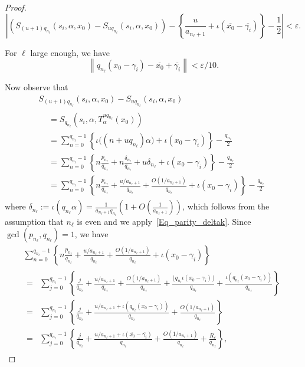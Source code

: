\documentclass[AHL,Unicode,longabstracts,published]{cedram}
\newcommand{\kj}{n_{\ell}}
\begin{document}
\begin{proof}
\begin{equation}\label{partial_sum_sawtooth}
\left|\left(S_{(u+1)q_{\kj}}(s_i,\alpha,x_0) - S_{uq_{\kj}}(s_i,\alpha,x_0)\right)
- \left \{ \frac{u}{a_{\kj +1}} + \iota(\overline{x_0} - \overline{\gamma_i}) \right \} - \frac{1}{2} \right| < \varepsilon.
\end{equation}

For $\ell$ large enough, we have
\[
\left\| q_{\kj} (x_0-\gamma_i) - \overline{x_0} + \overline{\gamma_i}\right\| < \varepsilon/10.
\]

Now observe that
\begin{multline*}
S_{(u+1)q_{\kj}}(s_i,\alpha,x_0) - S_{uq_{\kj}}(s_i,\alpha,x_0)\\
\begin{aligned}
&= S_{q_{\kj}}\left(s_i, \alpha, T_{\alpha}^{uq_{\kj}}(x_0)\right) \\
&=\sum_{n = 0}^{q_{\kj}-1} \left \{ \iota\big((n + uq_{\kj})\alpha \big) + \iota(x_0-\gamma_i)\right \} - \frac{q_{\kj}}{2}\\
&=
\sum_{n = 0}^{q_{\kj}-1} \left \{ n\frac{p_{\kj}}{q_{\kj}} + n\frac{\delta_{\kj}}{q_{\kj}}+u\delta_{\kj} + \iota(x_0 -\gamma_i) \right\} - \frac{q_{\kj}}{2} \\
&= \sum_{n = 0}^{q_{\kj}-1} \left\{ n\frac{p_{\kj}}{q_{\kj}} +\frac{u/a_{\kj+1}}{q_{\kj}} + \frac{O(1/a_{\kj+1})}{q_{\kj}} + \iota(x_0 - \gamma_i) \right\} - \frac{q_{\kj}}{2}
\end{aligned}
\end{multline*}
where $\delta_{\kj} := \iota(q_{\kj} \alpha) = \frac{1}{a_{\kj+1}q_{\kj}}(1 + O(\frac{1}{a_{\kj+1}}))$, which follows from the assumption that $\kj$ is even and we apply~\eqref{Eq_parity_deltak}. Since $\gcd(p_{\kj},q_{\kj}) =1$, we have
\begin{multline*}
\sum_{n = 0}^{q_{\kj}-1} \left \{ n\frac{p_{\kj}}{q_{\kj}} +\frac{u/a_{\kj+1}}{q_{\kj}} + \frac{O(1/a_{\kj+1})}{q_{\kj}} + \iota(x_0 -\gamma_i) \right\}
\\
\begin{aligned}
=&
\sum_{j = 0}^{q_{\kj}-1} \left \{ \frac{j}{q_{\kj}} +\frac{u/a_{\kj+1}}{q_{\kj}} + \frac{O(1/a_{\kj+1})}{q_{\kj}} + \frac{\lfloor q_{\kj} \iota(x_0 - \gamma_i)\rfloor}{q_{\kj}} + \frac{\iota(q_{\kj} (x_0- \gamma_i))}{q_{\kj}} \right \}\\
=&
\sum_{j = 0}^{q_{\kj}-1} \left\{ \frac{j}{q_{\kj}} +\frac{u/a_{\kj+1} + \iota \left(q_{\kj} (x_0- \gamma_i)\right)}{q_{\kj}} + \frac{O(1/a_{\kj+1})}{q_{\kj}}\right\}
\\
=&
\sum_{j = 0}^{q_{\kj}-1} \left\{ \frac{j}{q_{\kj}} +\frac{u/a_{\kj+1} + \iota \left(\overline{x_0} - \overline{\gamma_i}\right)}{q_{\kj}} + \frac{O(1/a_{\kj+1})}{q_{\kj}} + \frac{R_\varepsilon}{q_{\kj}}\right\},
\end{aligned}
\end{multline*}


\end{proof}
\end{document}
